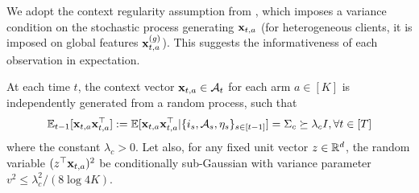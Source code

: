 We adopt the context regularity assumption from \cite{gentile2014online,li2019improved,li2021unifying}, which imposes a variance condition on the stochastic process generating $\mathbf{x}_{t,a}$ (for heterogeneous clients, it is imposed on global features $\mathbf{x}_{t,a}^{(g)}$). This suggests the informativeness of each observation in expectation. 
\begin{assumption} \label{assump:context_diversity}
At each time $t$, the context vector $\mathbf{x}_{t,a} \in \mathcal{A}_{t}$ for each arm $a\in [K]$ is independently generated from a random process, such that $$\mathbb{E}_{t-1}[\mathbf{x}_{t,a}\mathbf{x}_{t,a}^{\top}] := \mathbb{E}[\mathbf{x}_{t,a}\mathbf{x}_{t,a}^{\top}|\{i_{s},\mathcal{A}_{s},\eta_{s}\}_{s\in [t-1]}] =\Sigma_{c} \succeq \lambda_{c} I, \forall t\in [T]$$ where the constant $\lambda_{c} > 0$. Let also, for any fixed unit vector $z \in \mathbb{R}^{d}$, the random variable $(z^{\top} \mathbf{x}_{t,a})^{2}$ be conditionally sub-Gaussian with variance parameter $v^{2} \leq {\lambda_{c}^{2}}/{(8\log{4K})}$.
\end{assumption}
